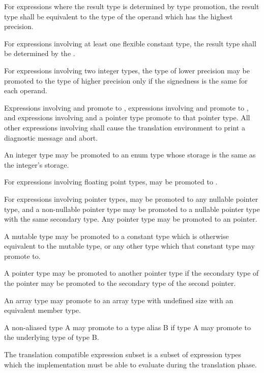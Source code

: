 \specsubitem
For expressions where the result type is determined by type promotion, the
result type shall be equivalent to the type of the operand which has the
highest precision.

\specsubitem
For expressions involving at least one flexible constant type, the result type
shall be determined by the .

\specsubitem
For expressions involving two integer types, the type of lower precision may be
promoted to the type of higher precision only if the signedness is the same for
each operand.

\specsubitem
Expressions involving  and  promote to
, expressions involving  and 
promote to , and expressions involving  and
a pointer type promote to that pointer type. All other expressions involving
 shall cause the translation environment to print a diagnostic
message and abort.

\specsubitem
An integer type may be promoted to an enum type whose storage is the
same as the integer's storage.

\specsubitem
For expressions involving floating point types,  may be promoted
to .

\specsubitem
For expressions involving pointer types,  may be promoted to any
nullable pointer type, and a non-nullable pointer type may be promoted to
a nullable pointer type with the same secondary type. Any pointer type may be
promoted to an  pointer.

\specsubitem
A mutable type may be promoted to a constant type which is otherwise equivalent
to the mutable type, or any other type which that constant type may promote to.

\specsubitem
A pointer type may be promoted to another pointer type if the secondary type of
the pointer may be promoted to the secondary type of the second pointer.

\specsubitem
An array type may promote to an array type with undefined size with an
equivalent member type.

\specsubitem
A non-aliased type A may promote to a type alias B if type A may promote to the
underlying type of type B.


The translation compatible expression subset is a subset of expression types
which the implementation must be able to evaluate during the translation phase.

